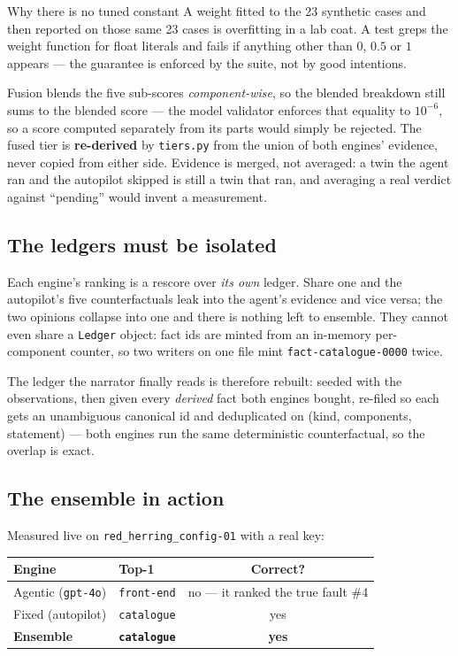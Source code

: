 \documentclass[11pt,a4paper]{article}
\newcommand{\code}[1]{\texttt{\small #1}}
\begin{document}
\begin{keybox}{Why there is no tuned constant}
A weight fitted to the 23 synthetic cases and then reported on those same 23
cases is overfitting in a lab coat. A test greps the weight function for float
literals and fails if anything other than $0$, $0.5$ or $1$ appears --- the
guarantee is enforced by the suite, not by good intentions.
\end{keybox}

Fusion blends the five sub-scores \emph{component-wise}, so the blended breakdown
still sums to the blended score --- the model validator enforces that equality to
$10^{-6}$, so a score computed separately from its parts would simply be rejected.
The fused tier is \textbf{re-derived} by \code{tiers.py} from the union of both
engines' evidence, never copied from either side. Evidence is merged, not
averaged: a twin the agent ran and the autopilot skipped is still a twin that
ran, and averaging a real verdict against ``pending'' would invent a measurement.

\subsection{The ledgers must be isolated}

Each engine's ranking is a rescore over \emph{its own} ledger. Share one and the
autopilot's five counterfactuals leak into the agent's evidence and vice versa;
the two opinions collapse into one and there is nothing left to ensemble. They
cannot even share a \code{Ledger} object: fact ids are minted from an in-memory
per-component counter, so two writers on one file mint \code{fact-catalogue-0000}
twice.

The ledger the narrator finally reads is therefore rebuilt: seeded with the
observations, then given every \emph{derived} fact both engines bought, re-filed
so each gets an unambiguous canonical id and deduplicated on
(kind, components, statement) --- both engines run the same deterministic
counterfactual, so the overlap is exact.

\subsection{The ensemble in action}

Measured live on \code{red\_herring\_config-01} with a real key:

\begin{center}
\footnotesize
\begin{tabular}{@{}llc@{}}
\toprule
\textbf{Engine} & \textbf{Top-1} & \textbf{Correct?} \\
\midrule
Agentic (\code{gpt-4o}) & \code{front-end} & no --- it ranked the true fault \#4 \\
Fixed (autopilot)       & \code{catalogue} & yes \\
\textbf{Ensemble}       & \textbf{\code{catalogue}} & \textbf{yes} \\
\bottomrule
\end{tabular}
\end{center}
\end{document}
